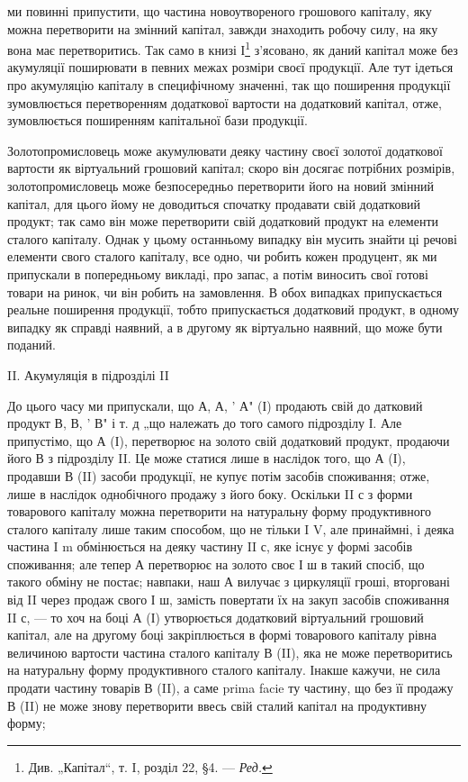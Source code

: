 \parcont{}  %
ми повинні припустити, що частина новоутвореного грошового капіталу,
яку можна перетворити на змінний капітал, завжди знаходить робочу
силу, на яку вона має перетворитись. Так само в книзі І\footnote*{
Див. „Капітал“, т. I, розділ 22, §4. — \emph{Ред.}
} з’ясовано,
як даний капітал може без акумуляції поширювати в певних межах розміри
своєї продукції. Але тут ідеться про акумуляцію капіталу в специфічному
значенні, так що поширення продукції зумовлюється перетворенням
додаткової вартости на додатковий капітал, отже, зумовлюється
поширенням капітальної бази продукції.

Золотопромисловець може акумулювати деяку частину своєї золотої
додаткової вартости як віртуальний грошовий капітал; скоро він досягає
потрібних розмірів, золотопромисловець може безпосередньо перетворити
його на новий змінний капітал, для цього йому не доводиться спочатку
продавати свій додатковий продукт; так само він може перетворити свій
додатковий продукт на елементи сталого капіталу. Однак у цьому останньому
випадку він мусить знайти ці речові елементи свого сталого капіталу,
все одно, чи робить кожен продуцент, як ми припускали в попередньому
викладі, про запас, а потім виносить свої готові товари на ринок,
чи він робить на замовлення. В обох випадках припускається реальне
поширення продукції, тобто припускається додатковий продукт, в
одному випадку як справді наявний, а в другому як віртуально наявний,
що може бути поданий.

II. Акумуляція в підрозділі II

До цього часу ми припускали, що А, А, ' А" (І) продають свій до
датковий продукт В, В, ' В" і т. д „що належать до того самого підрозділу
І. Але припустімо, що А (І), перетворює на золото свій додатковий
продукт, продаючи його В з підрозділу II. Це може статися
лише в наслідок того, що А (І), продавши В (II) засоби продукції,
не купує потім засобів споживання; отже, лише в наслідок однобічного
продажу з його боку. Оскільки II с з форми товарового капіталу можна
перетворити на натуральну форму продуктивного сталого капіталу лише
таким способом, що не тільки I V, але принаймні, і деяка частина I m
обмінюється на деяку частину II с, яке існує у формі засобів споживання;
але тепер А перетворює на золото своє І ш в такий спосіб, що такого
обміну не постає; навпаки, наш А вилучає з циркуляції гроші, вторговані
від II через продаж свого І ш, замість повертати їх на закуп засобів
споживання II с, — то хоч на боці А (І) утворюється додатковий
віртуальний грошовий капітал, але на другому боці закріплюється в формі
товарового капіталу рівна величиною вартости частина сталого капіталу
В (II), яка не може перетворитись на натуральну форму продуктивного
сталого капіталу. Інакше кажучи, не сила продати частину товарів
В (II), а саме prima facie ту частину, що без її продажу В (II) не може
знову перетворити ввесь свій сталий капітал на продуктивну форму;
\parbreak{}  %
